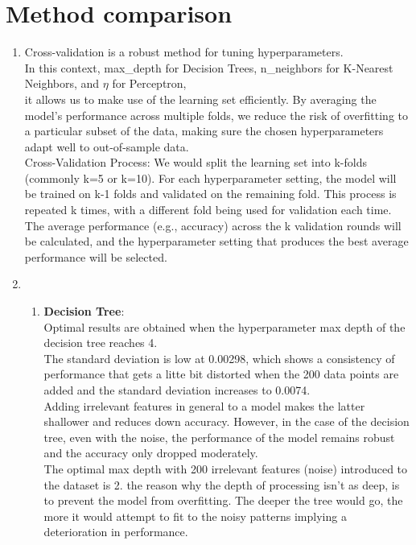 \documentclass[acmconf,nonacm=true]{acmart}
\begin{document}
\section{Method comparison}
\begin{enumerate}
    \item Cross-validation is a robust method for tuning hyperparameters. \\
     In this context, max\_depth for Decision Trees, n\_neighbors for K-Nearest Neighbors, and $\eta$ for Perceptron,\\
     it allows us to make use of the learning set efficiently.
     By averaging the model's performance across multiple folds, we reduce the risk of overfitting to a particular subset of the data, making sure the chosen hyperparameters adapt well to out-of-sample data.\\
     Cross-Validation Process:
    	We would split the learning set into k-folds (commonly k=5 or k=10).
    	For each hyperparameter setting, the model will be trained on k-1 folds and validated on the remaining fold.
    	This process is repeated k times, with a different fold being used for validation each time.
    	The average performance (e.g., accuracy) across the k validation rounds will be calculated, and the hyperparameter setting that produces the best average performance will be selected.
    \item
\begin{enumerate}
    \item \textbf{Decision Tree}:\\
    Optimal results are obtained when the hyperparameter max depth of the decision tree reaches 4.\\
    The standard deviation is low at 0.00298, which shows a consistency of performance that gets a litte bit distorted when the 200 data points are added and the standard deviation increases to 0.0074.\\
    Adding irrelevant features in general to a model makes the latter shallower and reduces down accuracy. However, in the case of the decision tree, even with the noise, the performance of the model remains robust and the accuracy only dropped moderately.\\
    The optimal max depth with 200 irrelevant features (noise) introduced to the dataset is 2. the reason why the depth of processing isn't as deep, is to prevent the model from overfitting. The deeper the tree would go, the more it would attempt to fit to the noisy patterns implying a deterioration in performance.

\end{enumerate}
\end{enumerate}
\end{document}
